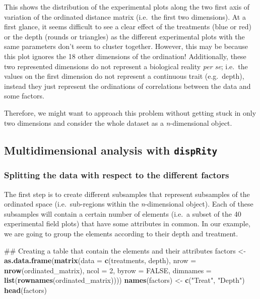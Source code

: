 \documentclass[]{book}
\newenvironment{Shaded}{\begin{snugshade}}{\end{snugshade}}
\newcommand{\KeywordTok}[1]{\textcolor[rgb]{0.13,0.29,0.53}{\textbf{#1}}}
\newcommand{\DataTypeTok}[1]{\textcolor[rgb]{0.13,0.29,0.53}{#1}}
\newcommand{\DecValTok}[1]{\textcolor[rgb]{0.00,0.00,0.81}{#1}}
\newcommand{\StringTok}[1]{\textcolor[rgb]{0.31,0.60,0.02}{#1}}
\newcommand{\OtherTok}[1]{\textcolor[rgb]{0.56,0.35,0.01}{#1}}
\newcommand{\NormalTok}[1]{#1}
\theoremstyle{definition}
\theoremstyle{definition}
\theoremstyle{remark}
\begin{document}
This shows the distribution of the experimental plots along the two
first axis of variation of the ordinated distance matrix (i.e.~the first
two dimensions). At a first glance, it seems difficult to see a clear
effect of the treatments (blue or red) or the depth (rounds or
triangles) as the different experimental plots with the same parameters
don't seem to cluster together. However, this may be because this plot
ignores the 18 other dimensions of the ordination! Additionally, these
two represented dimensions do not represent a biological reality
\emph{per se}; i.e.~the values on the first dimension do not represent a
continuous trait (e.g.~depth), instead they just represent the
ordinations of correlations between the data and some factors.

Therefore, we might want to approach this problem without getting stuck
in only two dimensions and consider the whole dataset as a
\emph{n}-dimensional object.

\subsection{\texorpdfstring{Multidimensional analysis with
\texttt{dispRity}}{Multidimensional analysis with dispRity}}\label{multidimensional-analysis-with-disprity}

\subsubsection{Splitting the data with respect to the different
factors}\label{splitting-the-data-with-respect-to-the-different-factors}

The first step is to create different subsamples that represent
subsamples of the ordinated space (i.e.~sub-regions within the
\emph{n}-dimensional object). Each of these subsamples will contain a
certain number of elements (i.e.~a subset of the 40 experimental field
plots) that have some attributes in common. In our example, we are going
to group the elements according to their depth and treatment.

\begin{Shaded}
\begin{Highlighting}[]
\NormalTok{## Creating a table that contain the elements and their attributes}
\NormalTok{factors <-}\StringTok{ }\KeywordTok{as.data.frame}\NormalTok{(}\KeywordTok{matrix}\NormalTok{(}\DataTypeTok{data =} \KeywordTok{c}\NormalTok{(treatments, depth),}
          \DataTypeTok{nrow =} \KeywordTok{nrow}\NormalTok{(ordinated_matrix), }\DataTypeTok{ncol =} \DecValTok{2}\NormalTok{, }\DataTypeTok{byrow =} \OtherTok{FALSE}\NormalTok{,}
          \DataTypeTok{dimnames =} \KeywordTok{list}\NormalTok{(}\KeywordTok{rownames}\NormalTok{(ordinated_matrix))))}
\KeywordTok{names}\NormalTok{(factors) <-}\StringTok{ }\KeywordTok{c}\NormalTok{(}\StringTok{"Treat"}\NormalTok{, }\StringTok{"Depth"}\NormalTok{)}
\KeywordTok{head}\NormalTok{(factors)}
\end{Highlighting}
\end{Shaded}
\end{document}
